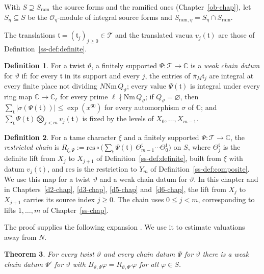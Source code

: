 \documentclass[reqno]{amsart}
\newcounter{chap}
\theoremstyle{definition}
\theoremstyle{plain}
\newtheorem{theorem}{Theorem}[section]
\theoremstyle{definition}
\newtheorem{definition}[theorem]{Definition}
\theoremstyle{remark}
\newcommand{\C}{{\mathbb{C}}}
\newcommand{\Oc}{\mathcal O}
\newcommand{\ram}{\mathrm{ram}}
\newcommand{\Nm}{\mathrm{Nm}\,}
\newcommand{\Tc}{\mathcal T}
\begin{document}
With \(S \supseteq S_\ram\) the source forms and the ramified ones (Chapter~\ref{ob-chap}), let \(S_\eta \subseteq S\) be the \(\Oc_\eta\)-module of integral source forms and \(S_{\ram,\eta} = S_\eta \cap S_\ram\).

The translations \(\mathfrak t = (\mathfrak t_j)_{j \ge 0} \in \Tc\) and the translated vacua \(v_j(\mathfrak t)\) are those of Definition~\ref{ss-def:definite}.

\begin{definition}\label{def:weak}
For a twist \(\vartheta\), a finitely supported \(\Psi\colon \Tc \to \C\) is a \emph{weak chain datum} for \(\vartheta\) if: for every \(\mathfrak t\) in its support and every \(j\), the entries of \(\bar{\pi}_M\mathfrak t_j\) are integral at every finite place not dividing \(N \Nm Q_\vartheta\); every value \(\Psi(\mathfrak t)\) is integral under every ring map \(\C \to \C_\ell\) for every prime \(\ell \nmid \Nm Q_\vartheta\); if \(Q_\vartheta = \varnothing\), then \(\sum_{\mathfrak t} \lvert\sigma(\Psi(\mathfrak t))\rvert \le \exp(x^{60})\) for every automorphism \(\sigma\) of \(\C\); and \(\sum_{\mathfrak t} \Psi(\mathfrak t) \bigotimes_{j < m} v_j(\mathfrak t)\) is fixed by the levels of \(X_0, \dots, X_{m-1}\).
\end{definition}

\begin{definition}\label{def:restricted}
For a tame character \(\xi\) and a finitely supported \(\Psi\colon\Tc\to\C\), the \emph{restricted chain} is \(R_{\xi,\Psi}:=\mathrm{res}\circ\bigl(\sum_{\mathfrak t}\Psi(\mathfrak t)\,\Theta^{\mathfrak t}_{m-1}\cdots\Theta^{\mathfrak t}_0\bigr)\) on \(S\), where \(\Theta^{\mathfrak t}_j\) is the definite lift from \(X_j\) to \(X_{j+1}\) of Definition~\ref{ss-def:definite}, built from \(\xi\) with datum \(v_j(\mathfrak t)\), and \(\mathrm{res}\) is the restriction to \(Y_m\) of Definition~\ref{ss-def:composite}.  We use this map for a twist \(\vartheta\) and a weak chain datum for \(\vartheta\).  In this chapter and in Chapters~\ref{d2-chap}, \ref{d3-chap}, \ref{d5-chap} and~\ref{d6-chap}, the lift from \(X_j\) to \(X_{j+1}\) carries its source index \(j\ge0\).  The chain uses \(0\le j<m\), corresponding to lifts \(1,\dots,m\) of Chapter~\ref{ss-chap}.
\end{definition}

The proof supplies the following expansion \cite{GL}.  We use it to estimate valuations away from \(N\).

\begin{theorem}\label{thm:plain}
For every twist \(\vartheta\) and every chain datum \(\Psi\) for \(\vartheta\) there is a weak chain datum \(\Psi'\) for \(\vartheta\) with \(B_{\vartheta,\Psi}\varphi = R_{\vartheta,\Psi'}\varphi\) for all \(\varphi \in S\).
\end{theorem}
\end{document}
